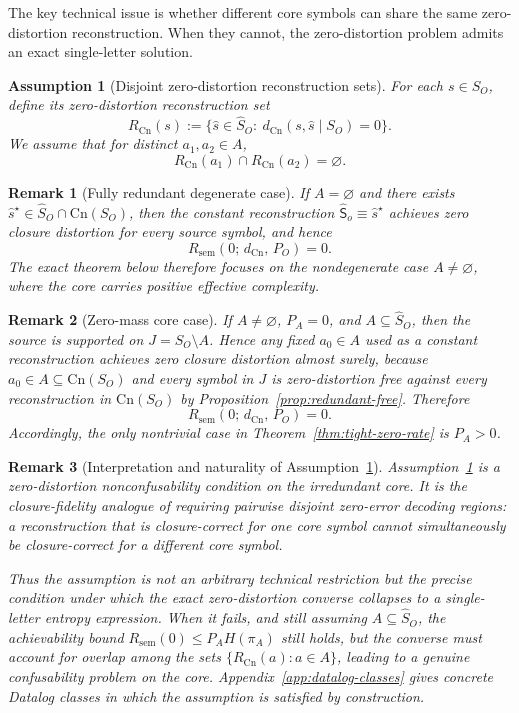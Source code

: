 \documentclass[journal,onecolumn]{IEEEtran}
\newcommand{\Cn}{\text{Cn}}
\newtheorem{assumption}{Assumption}[section]
\newtheorem{remark}{Remark}[section]
\numberwithin{equation}{section}
\begin{document}
The key technical issue is whether different core symbols can share
the same zero-distortion reconstruction.
When they cannot, the zero-distortion problem admits an exact
single-letter solution.

\begin{assumption}[Disjoint zero-distortion reconstruction sets]
\label{assump:core-disjoint}
For each \(s\in S_O\), define its zero-distortion reconstruction set
\[
  R_{\Cn}(s)
  :=
  \{\hat s\in\hat S_O:\ d_{\Cn}(s,\hat s\mid S_O)=0\}.
\]
We assume that for distinct \(a_1,a_2\in A\),
\[
  R_{\Cn}(a_1)\cap R_{\Cn}(a_2)=\varnothing.
\]
\end{assumption}

\begin{remark}[Fully redundant degenerate case]
\label{rem:fully-redundant-case}
If \(A=\varnothing\) and there exists
\(\hat s^\star\in \hat S_O\cap\Cn(S_O)\), then the constant
reconstruction \(\hat {\mathsf{S}}_o\equiv \hat s^\star\) achieves zero closure
distortion for every source symbol, and hence
\[
  R_{\mathrm{sem}}(0;\,d_{\Cn},\,P_O)=0.
\]
The exact theorem below therefore focuses on the nondegenerate case
\(A\neq\varnothing\), where the core carries positive effective
complexity.
\end{remark}

\begin{remark}[Zero-mass core case]
\label{rem:zero-mass-core-case}
If \(A\neq\varnothing\), \(P_A=0\), and \(A\subseteq\hat S_O\), then
the source is supported on \(J=S_O\setminus A\). Hence any fixed
\(a_0\in A\) used as a constant reconstruction achieves zero closure
distortion almost surely, because \(a_0\in A\subseteq \Cn(S_O)\) and
every symbol in \(J\) is zero-distortion free against every
reconstruction in \(\Cn(S_O)\) by
Proposition~\ref{prop:redundant-free}. Therefore
\[
  R_{\mathrm{sem}}(0;\,d_{\Cn},\,P_O)=0.
\]
Accordingly, the only nontrivial case in
Theorem~\ref{thm:tight-zero-rate} is \(P_A>0\).
\end{remark}

\begin{remark}[Interpretation and naturality of
Assumption~\ref{assump:core-disjoint}]
\label{rem:core-disjoint-general}
Assumption~\ref{assump:core-disjoint} is a
\emph{zero-distortion nonconfusability condition} on the irredundant
core.
It is the closure-fidelity analogue of requiring pairwise disjoint
zero-error decoding regions: a reconstruction that is closure-correct
for one core symbol cannot simultaneously be closure-correct for a
different core symbol.

Thus the assumption is not an arbitrary technical restriction but the
precise condition under which the exact zero-distortion converse
collapses to a single-letter entropy expression.
When it fails, and still assuming \(A\subseteq\hat S_O\), the
achievability bound
\(R_{\mathrm{sem}}(0)\le P_AH(\pi_A)\) still holds, but the converse
must account for overlap among the sets
\(\{R_{\Cn}(a):a\in A\}\), leading to a genuine confusability problem
on the core.
Appendix~\ref{app:datalog-classes} gives concrete Datalog classes in
which the assumption is satisfied by construction.
\end{remark}
\end{document}
